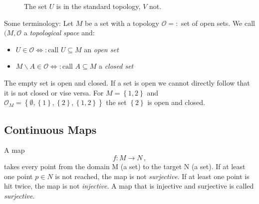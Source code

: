 \begin{figure}[h]
\centering
{}
\caption{The set $U$ is in the standard topology, $V$ not.}
\end{figure}

Some terminology: Let $M$ be a set with a topology $\mathcal{O} =:$ set of open sets.
We call $(M, \mathcal{O}$ a \textit{topological space} and:
    \begin{itemize}
        \item $U \in \mathcal{O} \Leftrightarrow: \text{call } U\subseteq M$ an \textit{open set}
        \item $M\backslash A \in \mathcal{O} \Leftrightarrow: \text{call } A\subseteq M$  a \textit{closed set}
    \end{itemize}
\begin{note}
    The empty set is open and closed. If a set is open we cannot directly follow that it is not closed or vise versa. For $M = \left\{ 1, 2 \right\}$ and $\mathcal{O}_M = \left\{ \emptyset, \left\{ 1 \right\}, \left\{ 2 \right\}, \left\{ 1,2 \right\} \right\}$ the set $\left\{ 2 \right\}$ is open and closed.
\end{note}

\subsection{Continuous Maps}
A map
\begin{equation}
    f: M \to N\,,
\end{equation}
takes every point from the domain M (a set) to the target N (a set).
If at least one point $p\in N$ is not reached, the map is not \textit{surjective}.
If at least one point is hit twice, the map is not \textit{injective}.
A map that is injective and surjective is called \textit{surjective}.

